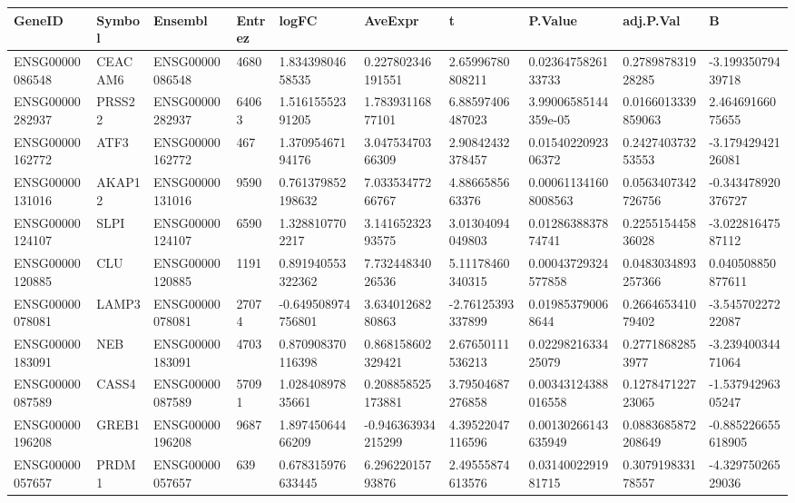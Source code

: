 \begingroup
\tiny
\setlength{\tabcolsep}{2pt}
\renewcommand{\arraystretch}{1.18}
\begin{tabular}{@{}llllllllll@{}}
\toprule
GeneID & Symbol & Ensembl & Entrez & logFC & AveExpr & t & P.Value & adj.P.Val & B \\
\midrule
ENSG00000086548 & CEACAM6 & ENSG00000086548 & 4680 & 1.83439804658535 & 0.227802346191551 & 2.65996780808211 & 0.0236475826133733 & 0.278987831928285 & -3.19935079439718 \\
ENSG00000282937 & PRSS22 & ENSG00000282937 & 64063 & 1.51615552391205 & 1.78393116877101 & 6.88597406487023 & 3.99006585144359e-05 & 0.0166013339859063 & 2.46469166075655 \\
ENSG00000162772 & ATF3 & ENSG00000162772 & 467 & 1.37095467194176 & 3.04753470366309 & 2.90842432378457 & 0.0154022092306372 & 0.242740373253553 & -3.17942942126081 \\
ENSG00000131016 & AKAP12 & ENSG00000131016 & 9590 & 0.761379852198632 & 7.03353477266767 & 4.8866585663376 & 0.000611341608008563 & 0.0563407342726756 & -0.343478920376727 \\
ENSG00000124107 & SLPI & ENSG00000124107 & 6590 & 1.3288107702217 & 3.14165232393575 & 3.01304094049803 & 0.0128638837874741 & 0.225515445836028 & -3.02281647587112 \\
ENSG00000120885 & CLU & ENSG00000120885 & 1191 & 0.891940553322362 & 7.73244834026536 & 5.11178460340315 & 0.00043729324577858 & 0.0483034893257366 & 0.040508850877611 \\
ENSG00000078081 & LAMP3 & ENSG00000078081 & 27074 & -0.649508974756801 & 3.63401268280863 & -2.76125393337899 & 0.019853790068644 & 0.266465341079402 & -3.54570227222087 \\
ENSG00000183091 & NEB & ENSG00000183091 & 4703 & 0.870908370116398 & 0.868158602329421 & 2.67650111536213 & 0.0229821633425079 & 0.27718682853977 & -3.23940034471064 \\
ENSG00000087589 & CASS4 & ENSG00000087589 & 57091 & 1.02840897835661 & 0.208858525173881 & 3.79504687276858 & 0.00343124388016558 & 0.127847122723065 & -1.53794296305247 \\
ENSG00000196208 & GREB1 & ENSG00000196208 & 9687 & 1.89745064466209 & -0.946363934215299 & 4.39522047116596 & 0.00130266143635949 & 0.0883685872208649 & -0.885226655618905 \\
ENSG00000057657 & PRDM1 & ENSG00000057657 & 639 & 0.678315976633445 & 6.29622015793876 & 2.49555874613576 & 0.0314002291981715 & 0.307919833178557 & -4.32975026529036 \\

\end{tabular}
